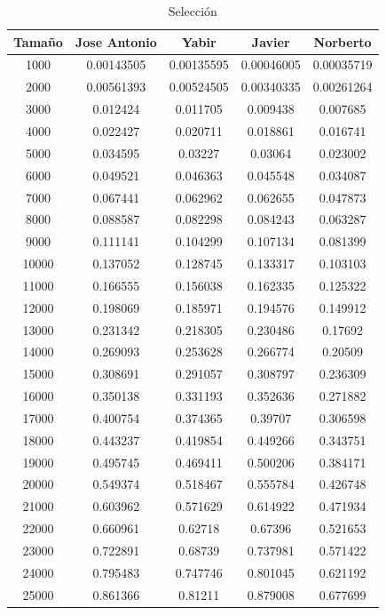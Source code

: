 \documentclass[11pt,a4paper]{article}
\begin{document}
\begin{table}[h]
	\centering
	\caption{Selección}
	\begin{tabular}{ | c | c  | c | c | c | }
		\hline
		Tama\~no & Jose Antonio & Yabir & Javier & Norberto\\
		\hline
		1000	&	0.00143505	&	0.00135595	&	0.00046005	&	0.00035719	\\
		2000	&	0.00561393	&	0.00524505	&	0.00340335	&	0.00261264	\\
		3000	&	0.012424	&	0.011705	&	0.009438	&	0.007685	\\
		4000	&	0.022427	&	0.020711	&	0.018861	&	0.016741	\\
		5000	&	0.034595	&	0.03227	&	0.03064	&	0.023002	\\
		6000	&	0.049521	&	0.046363	&	0.045548	&	0.034087	\\
		7000	&	0.067441	&	0.062962	&	0.062655	&	0.047873	\\
		8000	&	0.088587	&	0.082298	&	0.084243	&	0.063287	\\
		9000	&	0.111141	&	0.104299	&	0.107134	&	0.081399	\\
		10000	&	0.137052	&	0.128745	&	0.133317	&	0.103103	\\
		11000	&	0.166555	&	0.156038	&	0.162335	&	0.125322	\\
		12000	&	0.198069	&	0.185971	&	0.194576	&	0.149912	\\
		13000	&	0.231342	&	0.218305	&	0.230486	&	0.17692	\\
		14000	&	0.269093	&	0.253628	&	0.266774	&	0.20509	\\
		15000	&	0.308691	&	0.291057	&	0.308797	&	0.236309	\\
		16000	&	0.350138	&	0.331193	&	0.352636	&	0.271882	\\
		17000	&	0.400754	&	0.374365	&	0.39707	&	0.306598	\\
		18000	&	0.443237	&	0.419854	&	0.449266	&	0.343751	\\
		19000	&	0.495745	&	0.469411	&	0.500206	&	0.384171	\\
		20000	&	0.549374	&	0.518467	&	0.555784	&	0.426748	\\
		21000	&	0.603962	&	0.571629	&	0.614922	&	0.471934	\\
		22000	&	0.660961	&	0.62718	&	0.67396	&	0.521653	\\
		23000	&	0.722891	&	0.68739	&	0.737981	&	0.571422	\\
		24000	&	0.795483	&	0.747746	&	0.801045	&	0.621192	\\
		25000	&	0.861366	&	0.81211	&	0.879008	&	0.677699	\\
		\hline
	\end{tabular}
\end{table}
\end{document}
